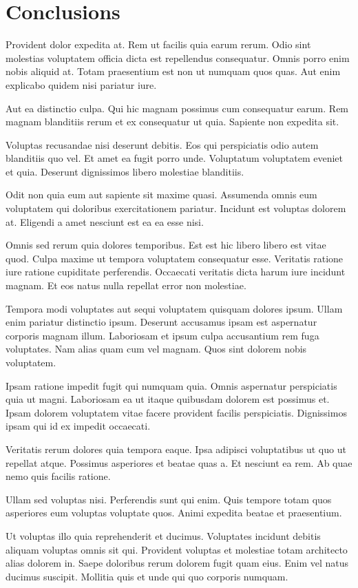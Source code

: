 \documentclass[a4paper]{article}
\begin{document}
\clearpage
\section*{Conclusions}

\begin{multicols}{2}

Provident dolor expedita at. Rem ut facilis quia earum rerum. Odio sint
    molestias voluptatem officia dicta est repellendus consequatur. Omnis porro
    enim nobis aliquid at. Totam praesentium est non ut numquam quos quas. Aut
    enim explicabo quidem nisi pariatur iure.

Aut ea distinctio culpa. Qui hic magnam possimus cum consequatur earum. Rem
    magnam blanditiis rerum et ex consequatur ut quia. Sapiente non expedita
    sit.

Voluptas recusandae nisi deserunt debitis. Eos qui perspiciatis odio autem
    blanditiis quo vel. Et amet ea fugit porro unde. Voluptatum voluptatem
    eveniet et quia. Deserunt dignissimos libero molestiae blanditiis.

Odit non quia eum aut sapiente sit maxime quasi. Assumenda omnis eum voluptatem
    qui doloribus exercitationem pariatur. Incidunt est voluptas dolorem at.
    Eligendi a amet nesciunt est ea ea esse nisi.

Omnis sed rerum quia dolores temporibus. Est est hic libero libero est vitae
    quod. Culpa maxime ut tempora voluptatem consequatur esse. Veritatis ratione
    iure ratione cupiditate perferendis. Occaecati veritatis dicta harum iure
    incidunt magnam. Et eos natus nulla repellat error non molestiae.

Tempora modi voluptates aut sequi voluptatem quisquam dolores ipsum. Ullam enim
    pariatur distinctio ipsum. Deserunt accusamus ipsam est aspernatur corporis
    magnam illum. Laboriosam et ipsum culpa accusantium rem fuga voluptates. Nam
    alias quam cum vel magnam. Quos sint dolorem nobis voluptatem.

Ipsam ratione impedit fugit qui numquam quia. Omnis aspernatur perspiciatis quia
    ut magni. Laboriosam ea ut itaque quibusdam dolorem est possimus et. Ipsam
    dolorem voluptatem vitae facere provident facilis perspiciatis. Dignissimos
    ipsam qui id ex impedit occaecati.

Veritatis rerum dolores quia tempora eaque. Ipsa adipisci voluptatibus ut quo ut
    repellat atque. Possimus asperiores et beatae quas a. Et nesciunt ea rem. Ab
    quae nemo quis facilis ratione.

Ullam sed voluptas nisi. Perferendis sunt qui enim. Quis tempore totam quos
    asperiores eum voluptas voluptate quos. Animi expedita beatae et
    praesentium.

Ut voluptas illo quia reprehenderit et ducimus. Voluptates incidunt debitis
    aliquam voluptas omnis sit qui. Provident voluptas et molestiae totam
    architecto alias dolorem in. Saepe doloribus rerum dolorem fugit quam eius.
    Enim vel natus ducimus suscipit. Mollitia quis et unde qui quo corporis
    numquam.

\end{multicols}
\end{document}
